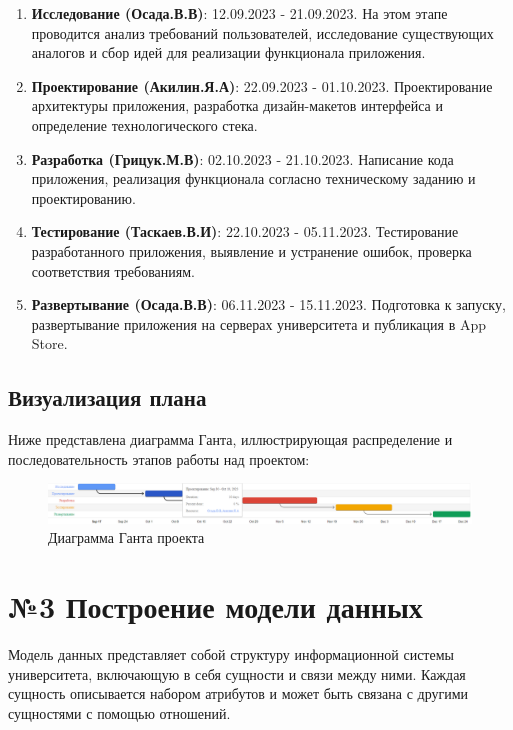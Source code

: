 \documentclass[a4paper,12pt]{article}
\begin{document}
\begin{enumerate}
  \item \textbf{Исследование (Осада.В.В)}: 12.09.2023 - 21.09.2023. На этом этапе проводится анализ требований пользователей, исследование существующих аналогов и сбор идей для реализации функционала приложения.
  
  \item \textbf{Проектирование (Акилин.Я.А)}: 22.09.2023 - 01.10.2023. Проектирование архитектуры приложения, разработка дизайн-макетов интерфейса и определение технологического стека.
  
  \item \textbf{Разработка (Грицук.М.В)}: 02.10.2023 - 21.10.2023. Написание кода приложения, реализация функционала согласно техническому заданию и проектированию.
  
  \item \textbf{Тестирование (Таскаев.В.И)}: 22.10.2023 - 05.11.2023. Тестирование разработанного приложения, выявление и устранение ошибок, проверка соответствия требованиям.
  
  \item \textbf{Развертывание (Осада.В.В)}: 06.11.2023 - 15.11.2023. Подготовка к запуску, развертывание приложения на серверах университета и публикация в App Store.
\end{enumerate}

\subsection{Визуализация плана}

Ниже представлена диаграмма Ганта, иллюстрирующая распределение и последовательность этапов работы над проектом:

\begin{figure}[h!]
  \centering
  \includegraphics[width=\textwidth]{gant.png}
  \caption{Диаграмма Ганта проекта}
\end{figure}

\section{№3 Построение модели данных}

Модель данных представляет собой структуру информационной системы университета, включающую в себя сущности и связи между ними. Каждая сущность описывается набором атрибутов и может быть связана с другими сущностями с помощью отношений.
\end{document}
